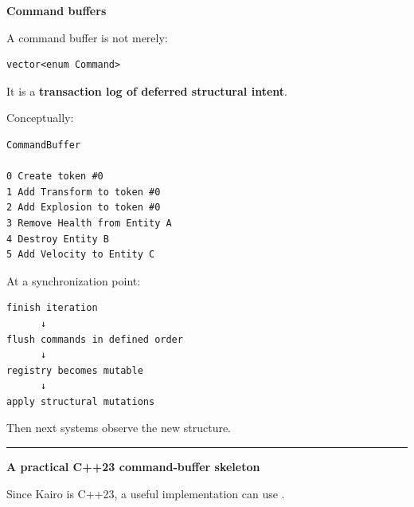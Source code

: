 \textbf{Command buffers}

A command buffer is not merely:

\begin{verbatim}
vector<enum Command>
\end{verbatim}

It is a \textbf{transaction log of deferred structural intent}.

Conceptually:

\begin{verbatim}
CommandBuffer

0 Create token #0
1 Add Transform to token #0
2 Add Explosion to token #0
3 Remove Health from Entity A
4 Destroy Entity B
5 Add Velocity to Entity C
\end{verbatim}

At a synchronization point:

\begin{verbatim}
finish iteration
      ↓
flush commands in defined order
      ↓
registry becomes mutable
      ↓
apply structural mutations
\end{verbatim}

Then next systems observe the new structure.

\begin{center}\rule{0.5\linewidth}{0.5pt}\end{center}

\textbf{A practical C++23 command-buffer skeleton}

Since Kairo is C++23, a useful implementation can use .

